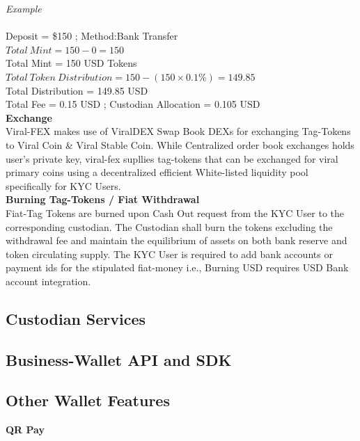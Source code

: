 \documentclass[10pt]{article}
\begin{document}
\textit{Example}\\\\
Deposit = \$150 ; Method:Bank Transfer\\
$Total\:Mint=150-0 = 150$\\
Total Mint = 150 USD Tokens\\
$Total\:Token\:Distribution=150-(150 \times 0.1\%)=149.85$\\
Total Distribution = 149.85 USD\\
Total Fee = 0.15 USD ; Custodian Allocation = 0.105 USD\\

\textbf{Exchange}\\

Viral-FEX makes use of ViralDEX Swap Book DEXs for exchanging Tag-Tokens to Viral Coin \& Viral Stable Coin. While Centralized order book exchanges holds user's private key, viral-fex supllies tag-tokens that can be exchanged for viral primary coins using a decentralized efficient White-listed liquidity pool specifically for KYC Users.\\




\textbf{Burning Tag-Tokens / Fiat Withdrawal}\\

Fiat-Tag Tokens are burned upon Cash Out request from the KYC User to the corresponding custodian. The Custodian shall burn the tokens excluding the withdrawal fee and maintain the equilibrium of assets on both bank reserve and token circulating supply. The KYC User is required to add bank accounts or payment ids for the stipulated fiat-money i.e., Burning USD requires USD Bank account integration. 


\subsection{Custodian Services}

\subsection{Business-Wallet API and SDK}

\subsection{Other Wallet Features}

\textbf{QR Pay}\\
\end{document}
